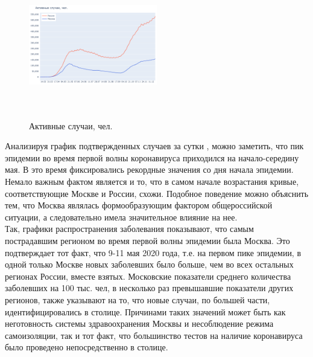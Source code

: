 \documentclass[a4paper, 12pt]{extarticle}
\begin{document}
\begin{figure}
    \centering
    \vspace{-20pt}
    \includegraphics[height=180pt, width=0.50\textwidth]{../plots/2active_cases_russia_moscow.pdf}
    \caption{Активные случаи, чел.}
    \label{fig:day_active_russia_moscow}
\end{figure}

Анализируя график подтвержденных случаев за сутки , можно заметить, что пик эпидемии во время первой волны коронавируса приходился на начало-середину мая. В это время фиксировались рекордные значения со дня начала эпидемии. Немало важным фактом является и то, что в самом начале возрастания кривые, соответствующие Москве и России, схожи. Подобное поведение можно объяснить тем, что Москва являлась формообразующим фактором общероссийской ситуации, а следовательно имела значительное влияние на нее.
\\

Так, графики распространения заболевания показывают, что самым пострадавшим регионом во время первой волны эпидемии была Москва. Это подтверждает тот факт, что 9-11 мая 2020 года, т.е. на первом пике эпидемии, в одной только Москве новых заболевших было больше, чем во всех остальных регионах России, вместе взятых. Московские показатели среднего количества заболевших на 100 тыс. чел, в несколько раз превышавшие показатели других регионов, также указывают на то, что новые случаи, по большей части, идентифицировались в столице. Причинами таких значений может быть как неготовность системы здравоохранения Москвы и несоблюдение режима самоизоляции, так и тот факт, что большинство тестов на наличие коронавируса было проведено непосредственно в столице.
\end{document}
